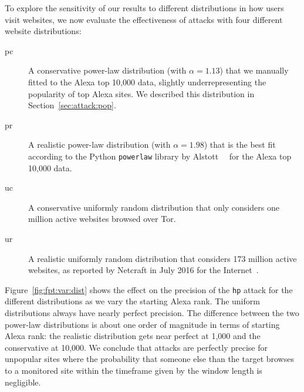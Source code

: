 To explore the sensitivity of our results to different distributions in
how users visit websites, we now evaluate the effectiveness of \name
attacks with four different website distributions:
\begin{description}
	\item[pc] A conservative power-law distribution
	(with $\alpha=1.13$)
	that we manually fitted to the Alexa top 10,000 data,
	slightly underrepresenting the popularity of top Alexa sites.
	We described this distribution in Section~\ref{sec:attack:pop}.
	\item[pr] A realistic power-law distribution
	(with $\alpha=1.98$)
	that is the best fit according to
	the Python {\tt powerlaw} library by Alstott~\ea~\cite{power-law} for the Alexa
	top 10,000 data.
	\item[uc] A conservative uniformly random distribution that
	only considers one million active websites browsed over Tor.
	\item[ur] A realistic uniformly random distribution that
          considers 173 million active websites, as reported by Netcraft
          in July 2016 for the Internet~\cite{numberofwebsites}.
\end{description}
Figure~\ref{fig:fpt:var:dist} shows the effect on the precision of the
\texttt{hp} attack for the different distributions as we vary the starting
Alexa rank. The uniform distributions always have nearly perfect precision.
The difference between the two power-law distributions is about one order of
magnitude in terms of starting Alexa rank: the realistic distribution gets
near perfect at 1,000 and the conservative at 10,000.
We conclude that \name attacks are perfectly precise for unpopular sites
where the probability that someone else than the target browses to a monitored
site within the timeframe given by the window length is negligible.
